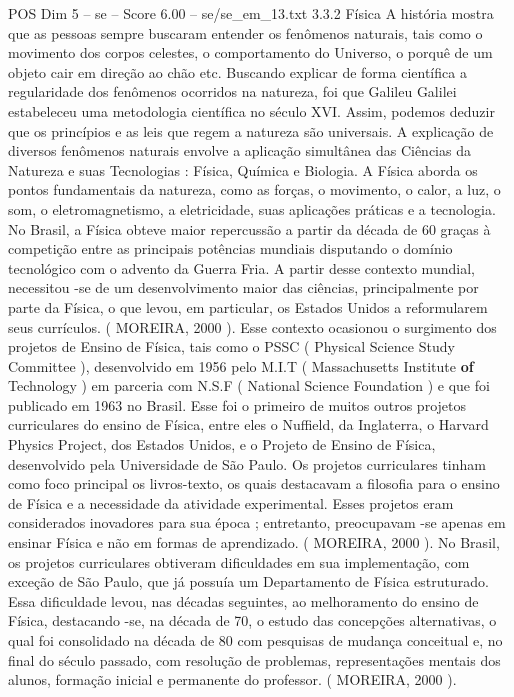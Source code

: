 \begin{textsample}{POS Dim 5 – se – Score 6.00 – se/se\_em\_13.txt}  \label{ex:f5_pos_135}
3.3.2 Física A história mostra que as pessoas sempre buscaram entender os fenômenos naturais, tais como o movimento dos corpos celestes, o comportamento do Universo, o porquê de um objeto cair em direção ao chão etc.
Buscando explicar de forma científica a regularidade dos fenômenos ocorridos na natureza, foi que Galileu Galilei estabeleceu uma metodologia científica no século XVI.
Assim, podemos deduzir que os princípios e as leis que regem a natureza são universais.
A explicação de diversos fenômenos naturais envolve a aplicação simultânea das Ciências da Natureza e suas Tecnologias : Física, Química e Biologia.
A Física aborda os pontos fundamentais da natureza, como as forças, o movimento, o calor, a luz, o som, o eletromagnetismo, a eletricidade, suas aplicações práticas e a tecnologia.
No Brasil, a Física obteve maior repercussão a partir da década de 60 graças à competição entre as principais potências mundiais disputando o domínio tecnológico com o advento da Guerra Fria.
A partir desse contexto mundial, necessitou -se de um desenvolvimento maior das ciências, principalmente por parte da Física, o que levou, em particular, os Estados Unidos a reformularem seus currículos. ( MOREIRA, 2000 ).
Esse contexto ocasionou o surgimento dos projetos de Ensino de Física, tais como o PSSC ( Physical Science Study Committee ), desenvolvido em 1956 pelo M.I.T ( Massachusetts Institute \textbf{of} Technology ) em parceria com N.S.F ( National Science Foundation ) e que foi publicado em 1963 no Brasil.
Esse foi o primeiro de muitos outros projetos curriculares do ensino de Física, entre eles o Nuffield, da Inglaterra, o Harvard Physics Project, dos Estados Unidos, e o Projeto de Ensino de Física, desenvolvido pela Universidade de São Paulo.
Os projetos curriculares tinham como foco principal os livros-texto, os quais destacavam a filosofia para o ensino de Física e a necessidade da atividade experimental.
Esses projetos eram considerados inovadores para sua época ; entretanto, preocupavam -se apenas em ensinar Física e não em formas de aprendizado. ( MOREIRA, 2000 ).
No Brasil, os projetos curriculares obtiveram dificuldades em sua implementação, com exceção de São Paulo, que já possuía um Departamento de Física estruturado.
Essa dificuldade levou, nas décadas seguintes, ao melhoramento do ensino de Física, destacando -se, na década de 70, o estudo das concepções alternativas, o qual foi consolidado na década de 80 com pesquisas de mudança conceitual e, no final do século passado, com resolução de problemas, representações mentais dos alunos, formação inicial e permanente do professor. ( MOREIRA, 2000 ).

\end{textsample}
